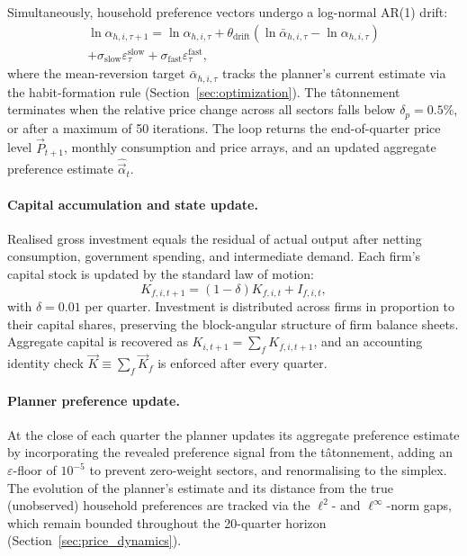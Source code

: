 Simultaneously, household preference vectors undergo a
log-normal AR(1) drift:
\begin{multline}
  \ln \alpha_{h,i,\tau+1}
  = \ln \alpha_{h,i,\tau}
  + \theta_{\text{drift}}\!\left(\ln \bar{\alpha}_{h,i,\tau} - \ln \alpha_{h,i,\tau}\right) \\
  + \sigma_{\text{slow}} \varepsilon_{\tau}^{\text{slow}}
  + \sigma_{\text{fast}} \varepsilon_{\tau}^{\text{fast}},
\end{multline}
where the mean-reversion target $\bar{\alpha}_{h,i,\tau}$ tracks the
planner's current estimate via the habit-formation rule
(Section~\ref{sec:optimization}).
The tâtonnement terminates when the relative price change across all
sectors falls below $\delta_p = 0.5\%$, or after a maximum of 50
iterations.
The loop returns the end-of-quarter price level $\vec{P}_{t+1}$,
monthly consumption and price arrays, and an updated aggregate
preference estimate $\hat{\vec{\alpha}}_t$.

\paragraph{Capital accumulation and state update.}
Realised gross investment equals the residual of actual output after
netting consumption, government spending, and intermediate demand.
Each firm's capital stock is updated by the standard law of motion:
\begin{equation}
  K_{f,i,t+1} = (1 - \delta) K_{f,i,t} + I_{f,i,t},
\end{equation}
with $\delta = 0.01$ per quarter.
Investment is distributed across firms in proportion to their capital
shares, preserving the block-angular structure of firm balance sheets.
Aggregate capital is recovered as $K_{i,t+1} = \sum_f K_{f,i,t+1}$,
and an accounting identity check $\vec{K} \equiv \sum_f \vec{K}_f$
is enforced after every quarter.

\paragraph{Planner preference update.}
At the close of each quarter the planner updates its aggregate preference
estimate by incorporating the revealed preference signal from the
tâtonnement, adding an $\varepsilon$-floor of $10^{-5}$ to prevent
zero-weight sectors, and renormalising to the simplex.
The evolution of the planner's estimate and its distance from the true
(unobserved) household preferences are tracked via the $\ell^2$- and
$\ell^\infty$-norm gaps, which remain bounded throughout the 20-quarter
horizon (Section~\ref{sec:price_dynamics}).

